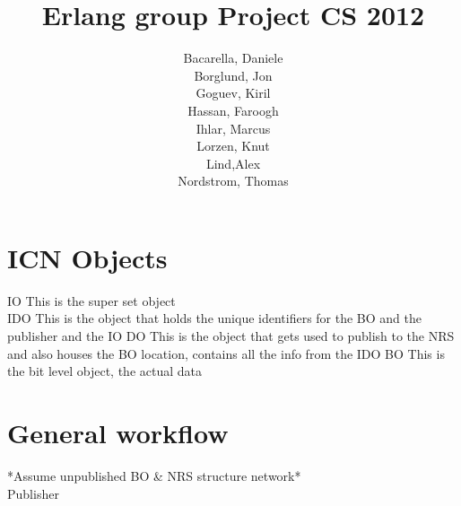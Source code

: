 \documentclass[11pt]{article}
\title{\textbf{Erlang group Project CS 2012}}
\author{Bacarella, Daniele\\
		Borglund, Jon\\
		Goguev, Kiril\\
		Hassan, Faroogh\\
		Ihlar, Marcus\\
		Lorzen, Knut\\
		Lind,Alex\\
		Nordstrom, Thomas\\}
\date{}
\begin{document}
\maketitle

\section{ICN Objects}
IO This is the super set object\\
IDO This is the object that holds the unique identifiers for the BO and the publisher and the IO
DO This is the object that gets used to publish to the NRS and also houses the BO location, contains all the info from the IDO
BO This is the bit level object, the actual data\\



\section{General workflow}

*Assume unpublished BO \& NRS structure network*\\

Publisher
\end{document}
